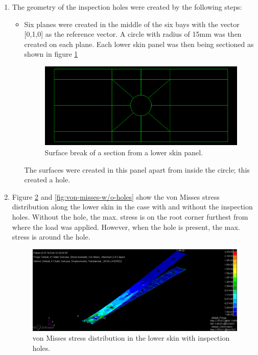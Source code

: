 \documentclass[11pt,a4paper,oneside]{memoir}
\begin{document}
\begin{enumerate}
    \item The geometry of the inspection holes were created by the following steps:
    \begin{itemize}
        \item Six planes were created in the middle of the six bays with the vector [0,1,0] as the reference vector. A circle with radius of 15mm was then created on each plane. Each lower skin panel was then being sectioned as shown in figure \ref{fig:ex.3-surface}
        \begin{figure}[h]
            \centering
            \includegraphics[width = .7\textwidth]{figures/LWR-surface.png}
            \caption{Surface break of a section from a lower skin panel.}
            \label{fig:ex.3-surface}
        \end{figure}
        The surfaces were created  in this panel apart from inside the circle; this created a hole.
    \end{itemize}
    \item Figure \ref{fig:von-misses-holes} and \ref{fig:von-misses-w/o-holes} show the von Misses stress distribution along the lower skin in the case with and without the inspection holes. Without the hole, the max. stress is on the root corner furthest from where the load was applied. However, when the hole is present, the max. stress is around the hole. 
    \begin{figure}[h]
        \centering
        \includegraphics[width = .8\textwidth]{figures/stress-distribution.png}
        \caption{von Misses stress distribution in the lower skin with inspection holes.}
        \label{fig:von-misses-holes}
    \end{figure}

\end{enumerate}
\end{document}
